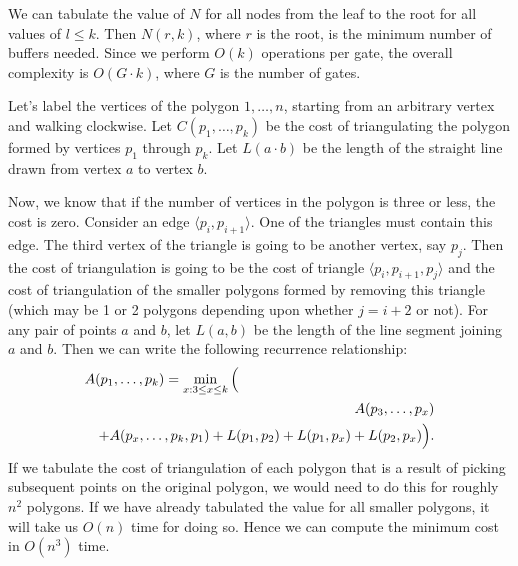 We can tabulate the value of $N$ for all nodes from the leaf to the root for
all values of $l \le k$. Then $N(r,k)$, where $r$ is the root,
is the minimum number of buffers needed.
Since we perform $O(k)$ operations per gate, 
the overall complexity is $O(G\cdot k)$, where $G$ is the number of gates.


Let's label the vertices of the polygon $1,\ldots,n$, starting from
an arbitrary vertex and walking clockwise.  Let $C(p_1,\ldots, p_k)$ be the cost
of triangulating the polygon formed by vertices $p_1$ through $p_k$. Let $L(a\cdot b)$ be the length of the straight line drawn from vertex
$a$ to vertex $b$. 

 Now, we know that if the number of vertices in the polygon is three or
 less, the cost is zero.  Consider an edge $\langle p_i, p_{i+1}\rangle$. One of the
 triangles must contain this edge. The third vertex of the triangle is
 going to be another vertex, say $p_j$. Then the cost of triangulation
 is going to be the cost of triangle $\langle p_i, p_{i+1}, p_j\rangle$ and the
 cost of triangulation of the smaller polygons formed by removing this
 triangle (which may be 1 or 2 polygons depending upon whether $j = i
 + 2$ or not). For any pair of points $a$ and $b$, let $L(a,b)$ be the
 length of the line segment joining $a$ and $b$. Then we can write the
 following recurrence relationship: 
\begin{eqnarray*}
\lefteqn{A(p_1, \ldots, p_k) = \min_{x: 3 \le x \le  k} \Big(} \\
& & A(p_3, \ldots, p_x)  \\
& & + A(p_x, \ldots,p_k,p_1) + L(p_1, p_2) + L(p_1,p_x) + L(p_2,p_x)\Big).
\end{eqnarray*}
If we tabulate the cost of triangulation of each polygon that is a
result of picking subsequent points on the original polygon, we
would need to do this for roughly $n^2$ polygons. If we have
already tabulated the value for all smaller polygons, it will take
us $O(n)$ time for doing so. Hence we can compute the minimum cost in
$O(n^3)$ time.

\begin{comment}
\ans{climbing}
Let $F(n)$ be the number of ways of climbing $n$ stairs through a
combination of 1 or 2 steps.  We can note that $F(1) = 1$ and $F(0) =
1$.
Now, all paths that lead us to cross $n$ steps either start with a
single step or a double step. In case of a single step, there are
$F(n-1)$ ways of completing the path. In case of a double step, there
are $F(n-2)$ ways of completing the path. Hence 
\[ F(n) = F(n-1) + F(n-2) , \] 
which leads to a simple dynamic programming algorithm that can compute
$F(n) $ in $O(n)$ time. An interesting thing to note 
here is that $F(n)$ has the same recurrence relationship as Fibonacci numbers and $F(n)$ is actually $(n +1)$-th Fibonacci number.

\end{comment}


